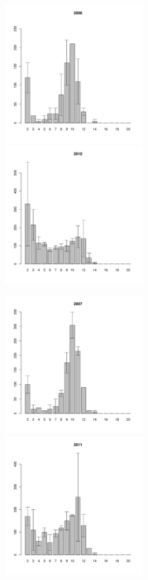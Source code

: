 \documentclass[12pt, a4paper]{article}
\begin{document}
\newpage \begin{figure}[h] 

\begin{multicols}{3}
\hfill
\includegraphics[width=60mm]{../White_Sea/Ryashkov_ZRS/zrs2_2006_.pdf}
\hfill
\includegraphics[width=60mm]{../White_Sea/Ryashkov_ZRS/zrs2_2010_.pdf}
\hfill

\end{multicols}



\begin{multicols}{3}
\hfill
\includegraphics[width=60mm]{../White_Sea/Ryashkov_ZRS/zrs2_2007_.pdf}
\hfill
\includegraphics[width=60mm]{../White_Sea/Ryashkov_ZRS/zrs2_2011_.pdf}
\hfill


\end{multicols}
\end{figure}
\end{document}
